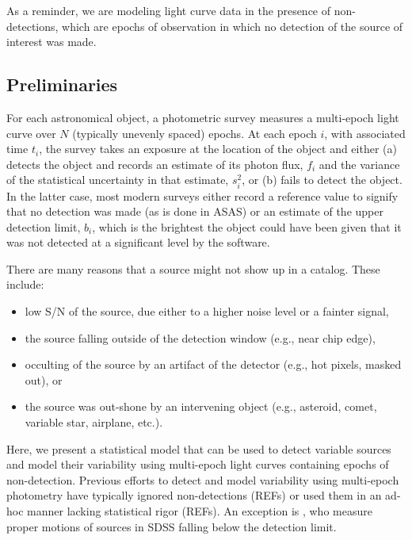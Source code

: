 \documentclass[12pt,preprint]{aastex}
\newcommand{\fobs}{f_i}
\newcommand{\sobs}{s^2_i}
\begin{document}

As a reminder, we are modeling light curve data in the presence of non-detections, which are epochs of observation in which no detection of the source of interest was made.

\subsection{Preliminaries}
\label{ss:prelim}

For each astronomical object, a photometric survey measures a multi-epoch light curve over $N$ (typically unevenly spaced) epochs.  At each epoch $i$, with associated time $t_i$, the survey takes an exposure at the location of the object and either (a) detects the object and records an estimate of its photon flux, $\fobs$ and the  variance of the statistical uncertainty in that estimate, $\sobs$, or (b) fails to detect the object.  In the latter case, most modern surveys either record a reference value to signify that no detection was made (as is done in ASAS) or an estimate of the upper detection limit, $b_i$, which is the brightest the object could have been given that it was not detected at a significant level by the software.

There are many reasons that a source might not show up in a catalog.  These include:
\begin{itemize}
\item low S/N of the source, due either to a higher noise level or a fainter signal,
\item the source falling outside of the detection window (e.g., near chip edge),
\item occulting of the source by an artifact of the detector (e.g., hot pixels, masked out), or
\item the source was out-shone by an intervening object (e.g., asteroid, comet, variable star, airplane, etc.).
\end{itemize}
Here, we present a statistical model that can be used to detect variable sources and model their variability using multi-epoch light curves containing epochs of non-detection.  Previous efforts to detect and model variability using multi-epoch photometry have typically ignored non-detections (REFs) or used them in an ad-hoc manner lacking statistical rigor (REFs).  An exception is \citet{2009AJ....137.4400L}, who measure proper motions of sources in SDSS falling below the detection limit.
\end{document}
